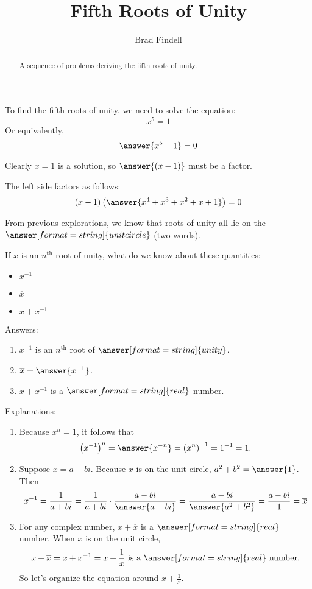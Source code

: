 \documentclass[space,nooutcomes]{ximera}
\title{Fifth Roots of Unity}
\author{Brad Findell}
\begin{document}
\begin{abstract}
A sequence of problems deriving the fifth roots of unity.   
\end{abstract}
\maketitle



\begin{problem}

To find the fifth roots of unity, we need to solve the equation: 
\[
x^5 = 1
\]
Or equivalently, 
\[
\answer{x^5 - 1} = 0
\]

\begin{problem}
Clearly $x=1$ is a solution, so $\answer{(x-1)}$ must be a factor.  

\begin{problem}
The left side factors as follows: 
\[
(x-1)\left(\answer{x^4+x^3+x^2+x+1}\right)=0
\]
\end{problem}
\end{problem}
\end{problem}

\begin{problem}
From previous explorations, we know that roots of unity all lie on the $\answer[format=string]{unit circle}$ (two words). 

If $x$ is an $n^\text{th}$ root of unity, what do we know about these quantities: 
\begin{itemize}
\item $x^{-1}$ 
\item $\overline{x}$
\item $x+x^{-1}$
\end{itemize}

Answers:
\begin{enumerate}
\item $x^{-1}$ is an $n^\text{th}$ root of $\answer[format=string]{unity}$.  
\item $\overline{x} = \answer{x^{-1}}$. 
\item $x+x^{-1}$ is a $\answer[format=string]{real}$ number.  
\end{enumerate}
\begin{problem}
Explanations: 
\begin{enumerate}
\item Because $x^n=1$, it follows that 
\[
\left(x^{-1}\right)^n = \answer{x^{-n}} = \left(x^n\right)^{-1} = 1^{-1} = 1. 
\]
\item Suppose $x=a+bi$. Because $x$ is on the unit circle, $a^2+b^2 = \answer{1}$.  Then 
\[
x^{-1}=\frac{1}{a+bi}=\frac{1}{a+bi}\cdot\frac{a-bi}{\answer{a-bi}}=\frac{a-bi}{\answer{a^2+b^2}}=\frac{a-bi}{1}=\overline{x}
\]
\item For any complex number, $x+\overline{x}$ is a $\answer[format=string]{real}$ number.  When $x$ is on the unit circle, 
\[
x + \overline{x} = x + x^{-1} = x + \frac{1}{x}\text{ is a }\answer[format=string]{real}\text{ number.}
\]
So let's organize the equation around $x + \frac{1}{x}$.  
\end{enumerate}
\end{problem}
\end{problem}
\end{document}

